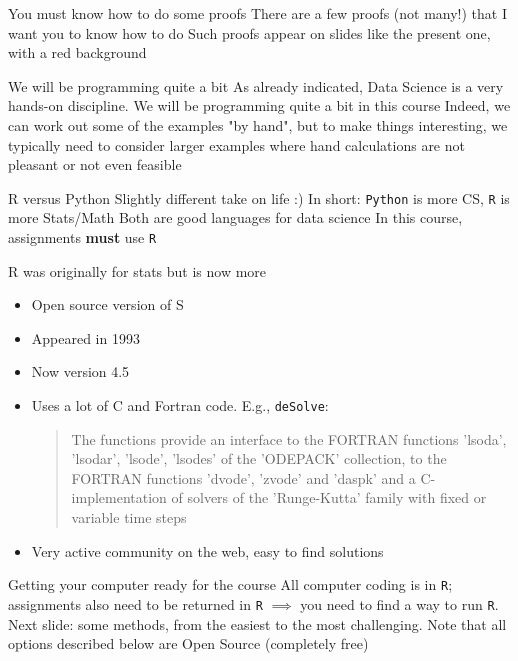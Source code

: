 \documentclass[aspectratio=169]{beamer}\usepackage[]{graphicx}\usepackage[]{xcolor}
\begin{document}
\begin{frame}[red]{You must know how to do some proofs}
There are a few proofs (not many!) that I want you to know how to do
\vfill
Such proofs appear on slides like the present one, with a red background
\end{frame}



\begin{frame}{We will be programming quite a bit}
As already indicated, Data Science is a very hands-on discipline. We will be programming quite a bit in this course
\vfill
Indeed, we can work out some of the examples "by hand", but to make things interesting, we typically need to consider larger examples where hand calculations are not pleasant or not even feasible
\end{frame}

\begin{frame}{R versus Python}
Slightly different take on life :)
\vfill
In short: \texttt{Python} is more CS, \texttt{R} is more Stats/Math
\vfill
Both are good languages for data science
\vfill
In this course, assignments \textbf{must} use \texttt{R}
\end{frame}

\begin{frame}{R was originally for stats but is now more}
\begin{itemize}
\item Open source version of S
\vfill
\item Appeared in 1993
\vfill
\item Now version 4.5
\vfill
\item Uses a lot of C and Fortran code. E.g., \texttt{deSolve}:
\begin{quote}
The functions provide an interface to the FORTRAN functions 'lsoda', 'lsodar', 'lsode', 'lsodes' of the 'ODEPACK' collection, to the FORTRAN functions 'dvode', 'zvode' and 'daspk' and a C-implementation of solvers of the 'Runge-Kutta' family with fixed or variable time steps
\end{quote}
\vfill
\item Very active community on the web, easy to find solutions \end{itemize}
\end{frame}

\begin{frame}{Getting your computer ready for the course}
All computer coding is in \texttt{R}; assignments also need to be returned in \texttt{R}
\vfill
$\implies$ you need to find a way to run \texttt{R}. Next slide: some methods, from the easiest to the most challenging.
\vfill
Note that all options described below are Open Source (completely free)
\end{frame}
\end{document}
